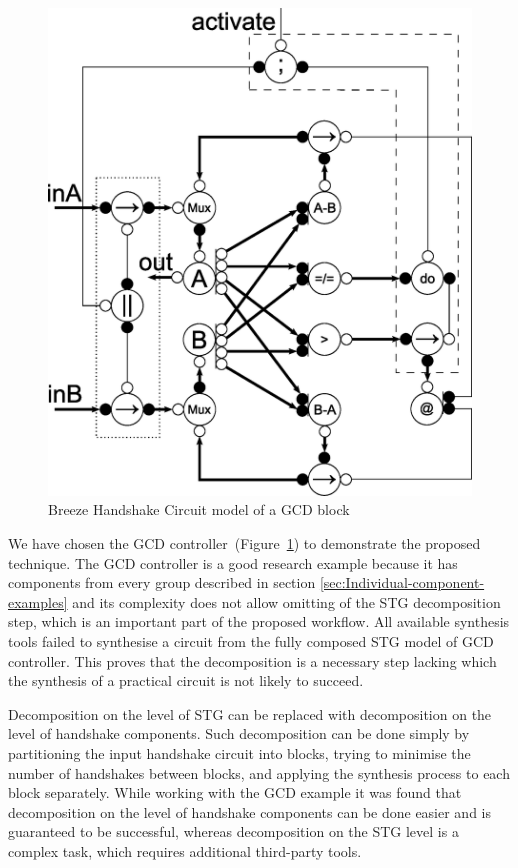 \begin{figure}[!t]
\centering
\includegraphics[width=0.3\paperwidth]{figures/breeze-gcd-partition}

\caption{Breeze Handshake Circuit model of a GCD block\label{fig:GCD}}
\end{figure}


We have chosen the GCD controller~(Figure~\ref{fig:GCD}) to demonstrate
the proposed technique. The GCD
controller is a good research example because it has components from
every group described in section \ref{sec:Individual-component-examples}
and its complexity does not allow omitting of the STG decomposition
step, which is an important part of the proposed workflow. All available
synthesis tools failed to synthesise a circuit from the fully composed
STG model of GCD controller. This proves that the decomposition is
a necessary step lacking which the synthesis of a practical circuit
is not likely to succeed.

Decomposition on the level of STG can be replaced with decomposition
on the level of handshake components. Such decomposition can be done
simply by partitioning the input handshake circuit into blocks, trying
to minimise the number of handshakes between blocks, and applying
the synthesis process to each block separately. While working with
the GCD example it was found that decomposition on the level of handshake
components can be done easier and is guaranteed to be successful,
whereas decomposition on the STG level is a complex task, which requires
additional third-party tools.


